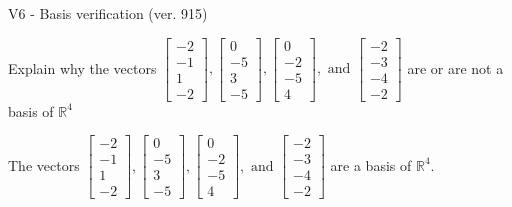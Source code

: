 \begin{exercise}
  \begin{exerciseTitle}V6 - Basis verification (ver. 915)\end{exerciseTitle}
  \begin{exerciseStatement}
    Explain why the vectors \(\left[\begin{array}{r}
-2 \\
-1 \\
1 \\
-2
\end{array}\right] , \left[\begin{array}{r}
0 \\
-5 \\
3 \\
-5
\end{array}\right] , \left[\begin{array}{r}
0 \\
-2 \\
-5 \\
4
\end{array}\right] , \text{ and } \left[\begin{array}{r}
-2 \\
-3 \\
-4 \\
-2
\end{array}\right]\) are or are not a basis of \(\mathbb{R}^4\)	


  \end{exerciseStatement}
  \begin{exerciseAnswer}
   The vectors \(\left[\begin{array}{r}
-2 \\
-1 \\
1 \\
-2
\end{array}\right] , \left[\begin{array}{r}
0 \\
-5 \\
3 \\
-5
\end{array}\right] , \left[\begin{array}{r}
0 \\
-2 \\
-5 \\
4
\end{array}\right] , \text{ and } \left[\begin{array}{r}
-2 \\
-3 \\
-4 \\
-2
\end{array}\right]\) 
  	 are  a basis of \(\mathbb{R}^4\).
  


  \end{exerciseAnswer}
\end{exercise}